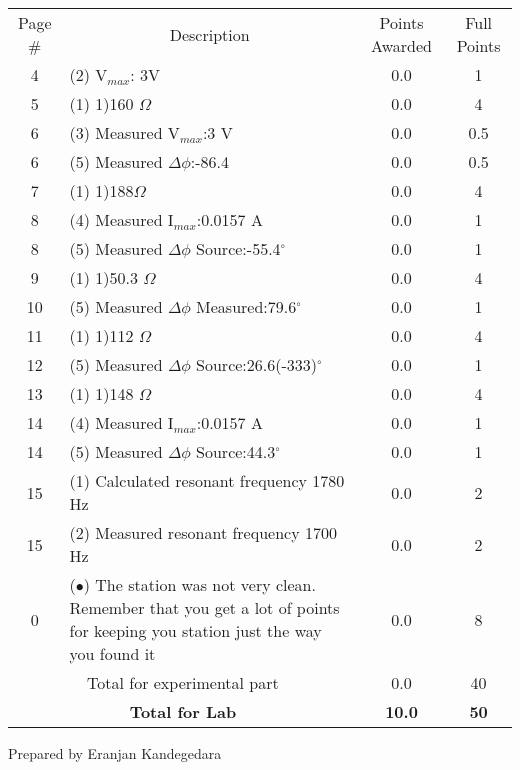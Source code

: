 \documentclass{article}
\begin{document}
\begin{table}[h!] \centering \label{my-label} \begin{tabular}{|c|p{11.75 cm}|c|c|}\hline
\multirow{2}{1cm}{Page \#}& \multicolumn{1}{|c|}{\multirow{2}{*}{Description}}  & \multirow{2}{1.5 cm}{Points Awarded} & \multirow{2}{1 cm}{Full Points} \\   &  &  &\\\hline
4&(2) V$_{max}$: 3V&0.0&1\\\hline
5&(1) 1)160 $\Omega$&0.0&4\\\hline
6&(3) Measured V$_{max}$:3 V&0.0&0.5\\\hline
6&(5) Measured $\Delta\phi$:-86.4&0.0&0.5\\\hline
7&(1) 1)188$\Omega$&0.0&4\\\hline
8&(4) Measured I$_{max}$:0.0157 A&0.0&1\\\hline
8&(5) Measured $\Delta\phi$ Source:-55.4$^{\circ}$&0.0&1\\\hline
9&(1) 1)50.3 $\Omega$&0.0&4\\\hline
10&(5) Measured $\Delta\phi$ Measured:79.6$^{\circ}$&0.0&1\\\hline
11&(1) 1)112 $\Omega$&0.0&4\\\hline
12&(5) Measured $\Delta\phi$ Source:26.6(-333)$^{\circ}$&0.0&1\\\hline
13&(1) 1)148 $\Omega$&0.0&4\\\hline
14&(4) Measured I$_{max}$:0.0157 A&0.0&1\\\hline
14&(5) Measured $\Delta\phi$ Source:44.3$^{\circ}$&0.0&1\\\hline
15&(1) Calculated resonant frequency 1780 Hz&0.0&2\\\hline
15&(2) Measured resonant frequency 1700 Hz&0.0&2\\\hline
0&($\bullet$) The station was not very clean. Remember that you get a lot of points for keeping you station just the way you found it&0.0&8\\\hline
\multicolumn{2}{|c|}{\multirow{1}{*}{Total for experimental part}} &0.0& 40 \\\hline\multicolumn{2}{|c|}{\multirow{2}{*}{\textbf{Total for Lab}}} &\multirow{2}{*}{\textbf{10.0}}& \multirow{2}{*}{\textbf{50}} \\ \multicolumn{2}{|c|}{}&&\\ \hline\hline\end{tabular}
 \end{table}
\clearpage
\null\vfill \begin{center}Prepared by Eranjan Kandegedara\end{center}  \clearpage
\end{document}
